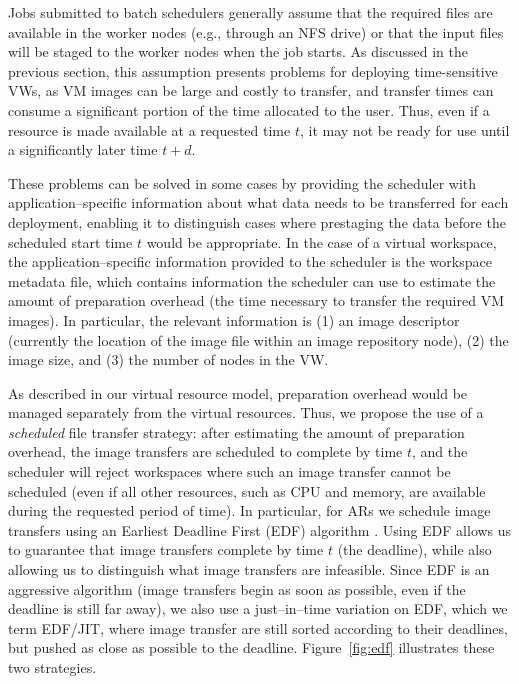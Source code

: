 Jobs submitted to batch schedulers generally assume that the required files are available in the worker nodes (e.g., through an NFS drive) or that the input files will be staged to the worker nodes when the job starts. As discussed in the previous section, this assumption presents problems for deploying time{}-sensitive VWs, as VM images can be large and costly to transfer, and transfer times can consume a significant portion of the time allocated to the user. Thus, even if a resource is made available at a requested time $t$, it may not be ready for use until a significantly later time $t+d$.

These problems can be solved in some cases by providing the scheduler with application--specific information about what data needs to be transferred for each deployment, enabling it to distinguish cases where prestaging the data before the scheduled start time $t$ would be appropriate. In the case of a virtual workspace, the application--specific information provided to the scheduler is the workspace metadata file, which contains information the scheduler can use to estimate the amount of preparation overhead (the time necessary to transfer the required VM images). In particular, the relevant information is (1) an image descriptor (currently the location of the image file within an image repository node), (2) the image size, and (3) the number of nodes in the VW.

As described in our virtual resource model, preparation overhead would be managed separately from the virtual resources. Thus, we propose the use of a \emph{scheduled} file transfer strategy: after estimating the amount of preparation overhead, the image transfers are scheduled to complete by time $t$, and the scheduler will reject workspaces where such an image transfer cannot be scheduled (even if all other resources, such as CPU and memory, are available during the requested period of time). In particular, for ARs we schedule image transfers using an Earliest Deadline First (EDF) algorithm \cite{BorjaCite22}. Using EDF allows us to guarantee that image transfers complete by time $t$ (the deadline), while also allowing us to distinguish what image transfers are infeasible. Since EDF is an aggressive algorithm (image transfers begin as soon as possible, even if the deadline is still far away), we also use a just--in--time variation on EDF, which we term EDF/JIT, where image transfer are still sorted according to their deadlines, but pushed as close as possible to the deadline. Figure~\ref{fig:edf} illustrates these two strategies.

